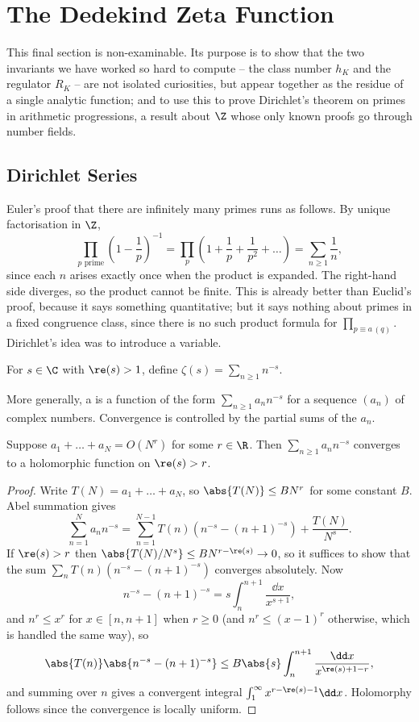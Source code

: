 \section{The Dedekind Zeta Function}\label{sec:zeta}

This final section is non-examinable. Its purpose is to show that the two invariants we have worked so hard to compute -- the class number $h_K$ and the regulator $R_K$ -- are not isolated curiosities, but appear together as the residue of a single analytic function; and to use this to prove Dirichlet's theorem on primes in arithmetic progressions, a result about $\Z$ whose only known proofs go through number fields.

\subsection{Dirichlet Series}

Euler's proof that there are infinitely many primes runs as follows. By unique factorisation in $\Z$,
$$\prod_{p \text{ prime}}\left(1-\frac1p\right)^{-1} = \prod_p\left(1+\frac1p+\frac{1}{p^2}+\dots\right) = \sum_{n\ge1}\frac1n,$$
since each $n$ arises exactly once when the product is expanded. The right-hand side diverges, so the product cannot be finite. This is already better than Euclid's proof, because it says something quantitative; but it says nothing about primes in a fixed congruence class, since there is no such product formula for $\prod_{p\equiv a\, (q)}$. Dirichlet's idea was to introduce a variable.

\begin{definition}
	For $s \in \C$ with $\re(s) > 1$, define $\displaystyle\zeta(s) = \sum_{n\ge1}n^{-s}$.
\end{definition}

More generally, a  is a function of the form $\sum_{n\ge1}a_nn^{-s}$ for a sequence $(a_n)$ of complex numbers. Convergence is controlled by the partial sums of the $a_n$.

\begin{lemma}\label{lem:dirichletconv}
	Suppose $a_1+\dots+a_N = O(N^r)$ for some $r \in \R$. Then $\sum_{n\ge1}a_nn^{-s}$ converges to a holomorphic function on $\re(s) > r$.
\end{lemma}

\begin{proof}
	Write $T(N) = a_1+\dots+a_N$, so $\abs{T(N)}\le BN^r$ for some constant $B$. Abel summation gives
	$$\sum_{n=1}^Na_nn^{-s} = \sum_{n=1}^{N-1}T(n)\left(n^{-s}-(n+1)^{-s}\right) + \frac{T(N)}{N^s}.$$
	If $\re(s) > r$ then $\abs{T(N)/N^s} \le B N^{r-\re(s)}\to0$, so it suffices to show that the sum $\sum_n T(n)\left(n^{-s}-(n+1)^{-s}\right)$ converges absolutely. Now
	$$n^{-s}-(n+1)^{-s} = s\int_n^{n+1}\frac{\dd x}{x^{s+1}},$$
	and $n^r \le x^r$ for $x \in [n,n+1]$ when $r \geq 0$ (and $n^r \le (x-1)^r$ otherwise, which is handled the same way), so
	$$\abs{T(n)}\abs{n^{-s}-(n+1)^{-s}} \le B\abs{s}\int_n^{n+1}\frac{\dd x}{x^{\re(s)+1-r}},$$
	and summing over $n$ gives a convergent integral $\int_1^\infty x^{r-\re(s)-1}\dd x$. Holomorphy follows since the convergence is locally uniform.
\end{proof}

